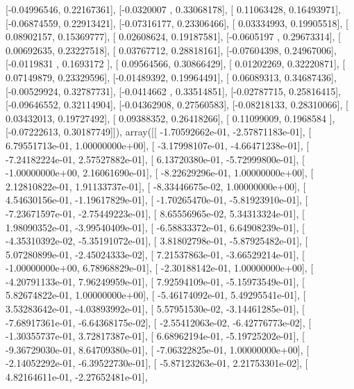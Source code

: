 \documentclass{article}
\begin{document}
       [-0.04996546,  0.22167361],
       [-0.0320007 ,  0.33068178],
       [ 0.11063428,  0.16493971],
       [-0.06874559,  0.22913421],
       [-0.07316177,  0.23306466],
       [ 0.03334993,  0.19905518],
       [ 0.08902157,  0.15369777],
       [ 0.02608624,  0.19187581],
       [-0.0605197 ,  0.29673314],
       [ 0.00692635,  0.23227518],
       [ 0.03767712,  0.28818161],
       [-0.07604398,  0.24967006],
       [-0.0119831 ,  0.1693172 ],
       [ 0.09564566,  0.30866429],
       [ 0.01202269,  0.32220871],
       [ 0.07149879,  0.23329596],
       [-0.01489392,  0.19964491],
       [ 0.06089313,  0.34687436],
       [-0.00529924,  0.32787731],
       [-0.0414662 ,  0.33514851],
       [-0.02787715,  0.25816415],
       [-0.09646552,  0.32114904],
       [-0.04362908,  0.27560583],
       [-0.08218133,  0.28310066],
       [ 0.03432013,  0.19727492],
       [ 0.09388352,  0.26418266],
       [ 0.11099009,  0.1968584 ],
       [-0.07222613,  0.30187749]]), array([[ -1.70592662e-01,  -2.57871183e-01],
       [  6.79551713e-01,   1.00000000e+00],
       [ -3.17998107e-01,  -4.66471238e-01],
       [ -7.24182224e-01,   2.57527882e-01],
       [  6.13720380e-01,  -5.72999800e-01],
       [ -1.00000000e+00,   2.16061690e-01],
       [ -8.22629296e-01,   1.00000000e+00],
       [  2.12810822e-01,   1.91133737e-01],
       [ -8.33446675e-02,   1.00000000e+00],
       [  4.54630156e-01,  -1.19617829e-01],
       [ -1.70265470e-01,  -5.81923910e-01],
       [ -7.23671597e-01,  -2.75449223e-01],
       [  8.65556965e-02,   5.34313324e-01],
       [  1.98090352e-01,  -3.99540409e-01],
       [ -6.58833372e-01,   6.64908239e-01],
       [ -4.35310392e-02,  -5.35191072e-01],
       [  3.81802798e-01,  -5.87925482e-01],
       [  5.07280899e-01,  -2.45024333e-02],
       [  7.21537863e-01,  -3.66529214e-01],
       [ -1.00000000e+00,   6.78968829e-01],
       [ -2.30188142e-01,   1.00000000e+00],
       [ -4.20791133e-01,   7.96249959e-01],
       [  7.92594109e-01,  -5.15973549e-01],
       [  5.82674822e-01,   1.00000000e+00],
       [ -5.46174092e-01,   5.49295541e-01],
       [  3.53283642e-01,  -4.03893992e-01],
       [  5.57951530e-02,  -3.14461285e-01],
       [ -7.68917361e-01,  -6.64368175e-02],
       [ -2.55412063e-02,  -6.42776773e-02],
       [ -1.30355737e-01,   3.72817387e-01],
       [  6.68962194e-01,  -5.19725202e-01],
       [ -9.36729030e-01,   8.64709380e-01],
       [ -7.06322825e-01,   1.00000000e+00],
       [ -2.14052292e-01,  -6.39522730e-01],
       [ -5.87123263e-01,   2.21753301e-02],
       [  4.82164611e-01,  -2.27652481e-01],
\end{document}
